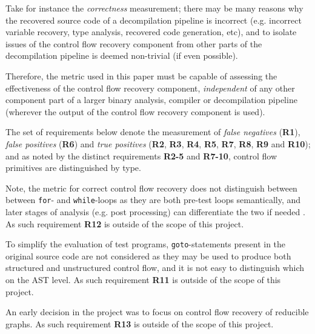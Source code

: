 Take for instance the \textit{correctness} measurement; there may be many reasons why the recovered source code of a decompilation pipeline is incorrect (e.g. incorrect variable recovery, type analysis, recovered code generation, etc), and to isolate issues of the control flow recovery component from other parts of the decompilation pipeline is deemed non-trivial (if even possible).

Therefore, the metric used in this paper must be capable of assessing the effectiveness of the control flow recovery component, \textit{independent} of any other component part of a larger binary analysis, compiler or decompilation pipeline (wherever the output of the control flow recovery component is used).

The set of requirements below denote the measurement of \textit{false negatives} (\textbf{R1}), \textit{false positives} (\textbf{R6}) and \textit{true positives} (\textbf{R2}, \textbf{R3}, \textbf{R4}, \textbf{R5}, \textbf{R7}, \textbf{R8}, \textbf{R9} and \textbf{R10}); and as noted by the distinct requirements \textbf{R2-5} and \textbf{R7-10}, control flow primitives are distinguished by type.

Note, the metric for correct control flow recovery does not distinguish between between \texttt{for}- and \texttt{while}-loops as they are both pre-test loops semantically, and later stages of analysis (e.g. post processing) can differentiate the two if needed \cite{no_more_gotos}. As such requirement \textbf{R12} is outside of the scope of this project.

To simplify the evaluation of test programs, \texttt{goto}-statements present in the original source code are not considered as they may be used to produce both structured and unstructured control flow, and it is not easy to distinguish which on the AST level. As such requirement \textbf{R11} is outside of the scope of this project.

An early decision in the project was to focus on control flow recovery of reducible graphs. As such requirement \textbf{R13} is outside of the scope of this project.

